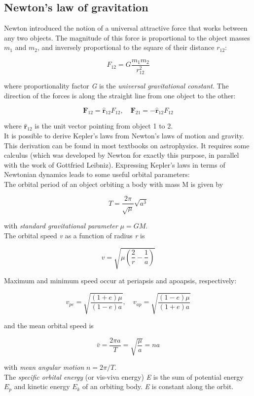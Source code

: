 \documentclass[Orbiter User Manual.tex]{subfiles}
\begin{document}
\subsection{Newton's law of gravitation}
Newton introduced the notion of a universal attractive force that works between any two objects. The magnitude of this force is proportional to the object masses $m_{1}$ and $m_{2}$, and inversely proportional to the square of their distance $r_{12}$:

\[ F_{12} = G \frac{m_{1}m_{2}}{r_{12}^{2}} \]

\noindent
where proportionality factor \textit{G} is the \textit{universal gravitational constant}. The direction of the forces is along the straight line from one object to the other:

\[ \textbf{F}_{12} = \hat{\textbf{r}}_{12} F_{12}, \quad \textbf{F}_{21} = - \hat{\textbf{r}}_{12} F_{12} \]

\noindent
where $\hat{\textbf{r}}_{12}$ is the unit vector pointing from object 1 to 2.\\
It is possible to derive Kepler's laws from Newton's laws of motion and gravity. This derivation can be found in most textbooks on astrophysics. It requires some calculus (which was developed by Newton for exactly this purpose, in parallel with the work of Gottfried Leibniz). Expressing Kepler's laws in terms of Newtonian dynamics leads to some useful orbital parameters:\\
The orbital period of an object orbiting a body with mass M is given by

\[ T = \frac{2 \pi}{\sqrt{\mu}} \sqrt{a^{3}} \]

\noindent
with \textit{standard gravitational parameter} $\mu = GM$.\\
The orbital speed \textit{v} as a function of radius \textit{r} is

\[ v = \sqrt{\mu \left(\frac{2}{r} - \frac{1}{a}\right)} \]

\noindent
Maximum and minimum speed occur at periapsis and apoapsis, respectively:

\[ v_{pe} = \sqrt{\frac{(1 + e) \mu}{(1 - e) a}}, \quad v_{ap} = \sqrt{\frac{(1 - e) \mu}{(1 + e) a}} \]

\noindent
and the mean orbital speed is

\[ \bar{v} = \frac{2 \pi a}{T} = \sqrt{\frac{\mu}{a}} = n a \]

\noindent
with \textit{mean angular motion} $n = 2 \pi / T$.\\
The \textit{specific orbital energy} (or vis-viva energy) \textit{E} is the sum of potential energy $E_{p}$ and kinetic energy $E_{k}$ of an orbiting body. \textit{E} is constant along the orbit.
\end{document}
